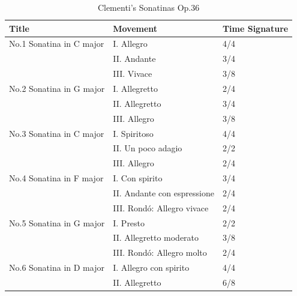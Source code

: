 \begin{table}
   \centering
   \caption{Clementi's Sonatinas Op.36 }
   \label{tab:cleminfo}
   \begin{tabular}{lll}
      \hline
      \textbf{Title} & \textbf{Movement} & \textbf{Time Signature}\\
      \hline
      No.1 Sonatina in C major&    I. Allegro &4/4\\
      &    II. Andante &3/4\\
      &    III. Vivace &3/8\\
      No.2 Sonatina in G major&    I. Allegretto &2/4\\
      &    II. Allegretto &3/4\\
      &    III. Allegro &3/8\\
      No.3 Sonatina in C major&    I. Spiritoso &4/4\\
      &    II. Un poco adagio &2/2\\
      &    III. Allegro &2/4\\
      No.4 Sonatina in F major&    I. Con spirito &3/4\\
      &    II. Andante con espressione &2/4\\
      &    III. Rondó: Allegro vivace &2/4\\
      No.5 Sonatina in G major&    I. Presto &2/2\\
      &    II. Allegretto moderato &3/8\\
      &    III. Rondó: Allegro molto &2/4\\
      No.6 Sonatina in D major&    I. Allegro con spirito &4/4\\
      &   II. Allegretto   &6/8\\
      \hline
   \end{tabular}
\end{table}


